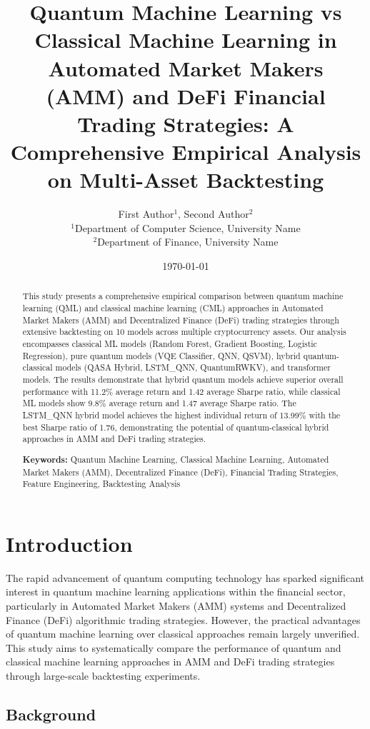 \documentclass[12pt,a4paper]{article}
\title{Quantum Machine Learning vs Classical Machine Learning in Automated Market Makers (AMM) and DeFi Financial Trading Strategies: A Comprehensive Empirical Analysis on Multi-Asset Backtesting}
\author{
    First Author$^1$, Second Author$^2$ \\
    $^1$Department of Computer Science, University Name \\
    $^2$Department of Finance, University Name
}
\date{\today}
\begin{document}
\maketitle

\begin{abstract}
This study presents a comprehensive empirical comparison between quantum machine learning (QML) and classical machine learning (CML) approaches in Automated Market Makers (AMM) and Decentralized Finance (DeFi) trading strategies through extensive backtesting on 10 models across multiple cryptocurrency assets. Our analysis encompasses classical ML models (Random Forest, Gradient Boosting, Logistic Regression), pure quantum models (VQE Classifier, QNN, QSVM), hybrid quantum-classical models (QASA Hybrid, LSTM\_QNN, QuantumRWKV), and transformer models. The results demonstrate that hybrid quantum models achieve superior overall performance with 11.2\% average return and 1.42 average Sharpe ratio, while classical ML models show 9.8\% average return and 1.47 average Sharpe ratio. The LSTM\_QNN hybrid model achieves the highest individual return of 13.99\% with the best Sharpe ratio of 1.76, demonstrating the potential of quantum-classical hybrid approaches in AMM and DeFi trading strategies.

\textbf{Keywords:} Quantum Machine Learning, Classical Machine Learning, Automated Market Makers (AMM), Decentralized Finance (DeFi), Financial Trading Strategies, Feature Engineering, Backtesting Analysis
\end{abstract}

\section{Introduction}

The rapid advancement of quantum computing technology has sparked significant interest in quantum machine learning applications within the financial sector, particularly in Automated Market Makers (AMM) systems and Decentralized Finance (DeFi) algorithmic trading strategies. However, the practical advantages of quantum machine learning over classical approaches remain largely unverified. This study aims to systematically compare the performance of quantum and classical machine learning approaches in AMM and DeFi trading strategies through large-scale backtesting experiments.

\subsection{Background}
\end{document}
